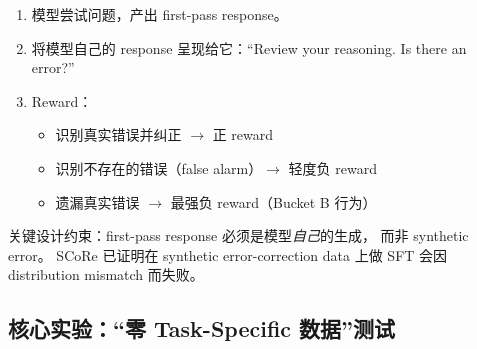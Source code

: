 \documentclass[12pt,a4paper]{article}
\begin{document}
\begin{enumerate}[leftmargin=2em]
  \item 模型尝试问题，产出 first-pass response。
  \item 将模型自己的 response 呈现给它：``Review your reasoning. Is there an error?''
  \item Reward：
    \begin{itemize}
      \item 识别真实错误并纠正 $\rightarrow$ 正 reward
      \item 识别不存在的错误（false alarm）$\rightarrow$ 轻度负 reward
      \item 遗漏真实错误 $\rightarrow$ 最强负 reward（Bucket B 行为）
    \end{itemize}
\end{enumerate}

\noindent
关键设计约束：first-pass response 必须是模型\textit{自己}的生成，
而非 synthetic error。
SCoRe 已证明在 synthetic error-correction data 上做 SFT 会因
distribution mismatch 而失败。

\subsection{核心实验：``零 Task-Specific 数据''测试}
\end{document}
